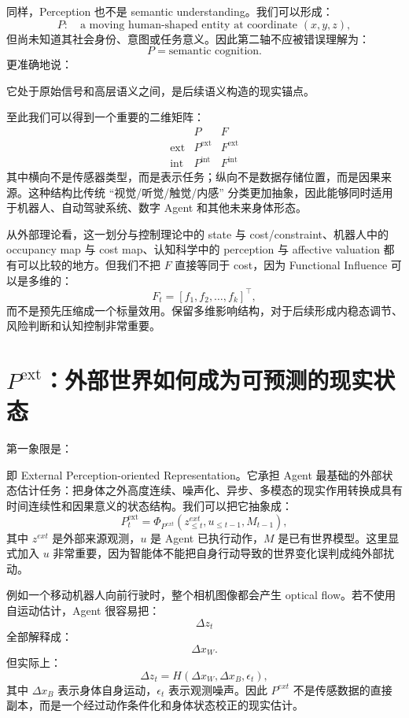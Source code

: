 同样，Perception 也不是 semantic understanding。我们可以形成：
\[
P:
\quad
\text{a moving human-shaped entity at coordinate }(x,y,z),
\]
但尚未知道其社会身份、意图或任务意义。因此第二轴不应被错误理解为：
\[
P=\text{semantic cognition}.
\]
更准确地说：
\begin{statementbox}
\centering
{}
\end{statementbox}
它处于原始信号和高层语义之间，是后续语义构造的现实锚点。

至此我们可以得到一个重要的二维矩阵：
\[
\begin{array}{c|cc}
 & P & F\\
\hline
\mathrm{ext}
&
P^{\mathrm{ext}}
&
F^{\mathrm{ext}}
\\
\mathrm{int}
&
P^{\mathrm{int}}
&
F^{\mathrm{int}}
\end{array}
\]
其中横向不是传感器类型，而是表示任务；纵向不是数据存储位置，而是因果来源。这种结构比传统 ``视觉/听觉/触觉/内感'' 分类更加抽象，因此能够同时适用于机器人、自动驾驶系统、数字 Agent 和其他未来身体形态。

从外部理论看，这一划分与控制理论中的 state 与 cost/constraint、机器人中的 occupancy map 与 cost map、认知科学中的 perception 与 affective valuation 都有可以比较的地方。但我们不把 $F$ 直接等同于 cost，因为 Functional Influence 可以是多维的：
\[
F_t
=
[
f_1,f_2,\ldots,f_k]^\top,
\]
而不是预先压缩成一个标量效用。保留多维影响结构，对于后续形成内稳态调节、风险判断和认知控制非常重要。

\section{$P^{\mathrm{ext}}$：外部世界如何成为可预测的现实状态}
\label{sec:external-perception}

第一象限是：
\begin{statementbox}
\centering
{}
\end{statementbox}
即 External Perception-oriented Representation。它承担 Agent 最基础的外部状态估计任务：把身体之外高度连续、噪声化、异步、多模态的现实作用转换成具有时间连续性和因果意义的状态结构。我们可以把它抽象成：
\[
P_t^{\mathrm{ext}}
=
\Phi_{P^{ext}}
(
z_{\leq t}^{ext},
u_{\leq t-1},
M_{t-1}
),
\]
其中 $z^{ext}$ 是外部来源观测，$u$ 是 Agent 已执行动作，$M$ 是已有世界模型。这里显式加入 $u$ 非常重要，因为智能体不能把自身行动导致的世界变化误判成纯外部扰动。

例如一个移动机器人向前行驶时，整个相机图像都会产生 optical flow。若不使用自运动估计，Agent 很容易把：
\[
\Delta z_t
\]
全部解释成：
\[
\Delta x_W.
\]
但实际上：
\[
\Delta z_t
=
H(
\Delta x_W,
\Delta x_B,
\epsilon_t
),
\]
其中 $\Delta x_B$ 表示身体自身运动，$\epsilon_t$ 表示观测噪声。因此 $P^{ext}$ 不是传感数据的直接副本，而是一个经过动作条件化和身体状态校正的现实估计。

